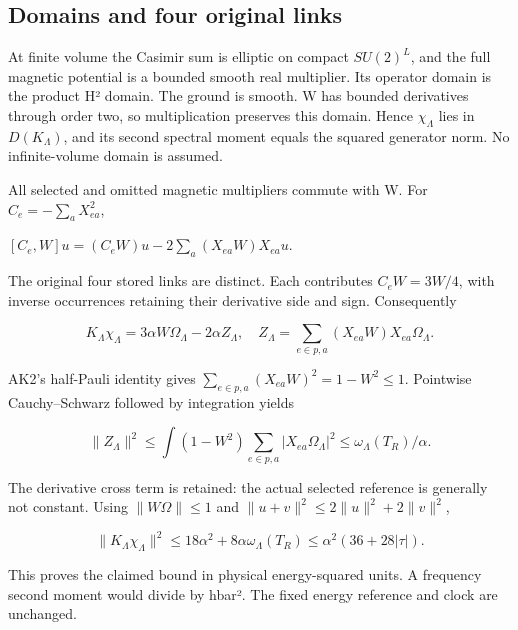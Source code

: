 \hypertarget{r29-ao1-domains-and-four-original-links}{%
\subsection{Domains and four original links}\label{r29:ao1:r29-ao1-domains-and-four-original-links}}

At finite volume the Casimir sum is elliptic on compact \(SU(2)^L\), and the full magnetic potential is a bounded smooth real multiplier. Its operator domain is the product H² domain. The ground is smooth. W has bounded derivatives through order two, so multiplication preserves this domain. Hence \(\chi_\Lambda\) lies in \(D(K_\Lambda)\), and its second spectral moment equals the squared generator norm. No infinite-volume domain is assumed.

All selected and omitted magnetic multipliers commute with W. For \(C_e=-\sum_aX_{ea}^2\),

\([C_e,W]u=(C_eW)u-2\sum_a(X_{ea}W)X_{ea}u\).

The original four stored links are distinct. Each contributes \(C_eW=3W/4\), with inverse occurrences retaining their derivative side and sign. Consequently

\begin{equation}
K_\Lambda\chi_\Lambda=3\alpha W\Omega_\Lambda-2\alpha Z_\Lambda,
\quad Z_\Lambda=\sum_{e\in p,a}(X_{ea}W)X_{ea}\Omega_\Lambda.\tag{HNM-AO1.4}
\label{r29:ao1:eq4}
\end{equation}

AK2's half-Pauli identity gives \(\sum_{e\in p,a}(X_{ea}W)^2=1-W^2\le1\). Pointwise Cauchy--Schwarz followed by integration yields

\begin{equation}
\|Z_\Lambda\|^2\le\int(1-W^2)\sum_{e\in p,a}|X_{ea}\Omega_\Lambda|^2
\le\omega_\Lambda(T_R)/\alpha.\tag{HNM-AO1.5}
\label{r29:ao1:eq5}
\end{equation}

The derivative cross term is retained: the actual selected reference is generally not constant. Using \(\|W\Omega\|\le1\) and \(\|u+v\|^2\le2\|u\|^2+2\|v\|^2\),

\begin{equation}
\|K_\Lambda\chi_\Lambda\|^2\le18\alpha^2+8\alpha\omega_\Lambda(T_R)
\le\alpha^2(36+28|\tau|).\tag{HNM-AO1.6}
\label{r29:ao1:eq6}
\end{equation}

This proves the claimed bound in physical energy-squared units. A frequency second moment would divide by hbar². The fixed energy reference and clock are unchanged.

